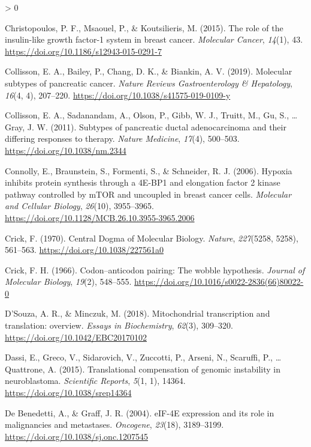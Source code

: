 \documentclass[
  12pt,
  openany]{book}
\newlength{\cslhangindent}
\newenvironment{CSLReferences}[2] %
 {%
  \setlength{\parindent}{0pt}
  \ifodd #1 \everypar{\setlength{\hangindent}{\cslhangindent}}\ignorespaces\fi
  \ifnum #2 > 0
  \setlength{\parskip}{#2\baselineskip}
  \fi
 }%
 {}
\begin{document}
\begin{CSLReferences}{1}{0}
\leavevmode\hypertarget{ref-Christopoulos2015}{}%
Christopoulos, P. F., Msaouel, P., \& Koutsilieris, M. (2015). The role of the insulin-like growth factor-1 system in breast cancer. \emph{Molecular Cancer}, \emph{14}(1), 43. \url{https://doi.org/10.1186/s12943-015-0291-7}

\leavevmode\hypertarget{ref-Collisson2019}{}%
Collisson, E. A., Bailey, P., Chang, D. K., \& Biankin, A. V. (2019). Molecular subtypes of pancreatic cancer. \emph{Nature Reviews Gastroenterology \& Hepatology}, \emph{16}(4, 4), 207--220. \url{https://doi.org/10.1038/s41575-019-0109-y}

\leavevmode\hypertarget{ref-Collisson2011}{}%
Collisson, E. A., Sadanandam, A., Olson, P., Gibb, W. J., Truitt, M., Gu, S., \ldots{} Gray, J. W. (2011). Subtypes of pancreatic ductal adenocarcinoma and their differing responses to therapy. \emph{Nature Medicine}, \emph{17}(4), 500--503. \url{https://doi.org/10.1038/nm.2344}

\leavevmode\hypertarget{ref-Connolly2006}{}%
Connolly, E., Braunstein, S., Formenti, S., \& Schneider, R. J. (2006). Hypoxia inhibits protein synthesis through a {4E}-{BP1} and elongation factor 2 kinase pathway controlled by {mTOR} and uncoupled in breast cancer cells. \emph{Molecular and Cellular Biology}, \emph{26}(10), 3955--3965. \url{https://doi.org/10.1128/MCB.26.10.3955-3965.2006}

\leavevmode\hypertarget{ref-Crick1970}{}%
Crick, F. (1970). Central {Dogma} of {Molecular Biology}. \emph{Nature}, \emph{227}(5258, 5258), 561--563. \url{https://doi.org/10.1038/227561a0}

\leavevmode\hypertarget{ref-Crick1966}{}%
Crick, F. H. (1966). Codon--anticodon pairing: The wobble hypothesis. \emph{Journal of Molecular Biology}, \emph{19}(2), 548--555. \url{https://doi.org/10.1016/s0022-2836(66)80022-0}

\leavevmode\hypertarget{ref-DSouza2018}{}%
D'Souza, A. R., \& Minczuk, M. (2018). Mitochondrial transcription and translation: overview. \emph{Essays in Biochemistry}, \emph{62}(3), 309--320. \url{https://doi.org/10.1042/EBC20170102}

\leavevmode\hypertarget{ref-Dassi2015}{}%
Dassi, E., Greco, V., Sidarovich, V., Zuccotti, P., Arseni, N., Scaruffi, P., \ldots{} Quattrone, A. (2015). Translational compensation of genomic instability in neuroblastoma. \emph{Scientific Reports}, \emph{5}(1, 1), 14364. \url{https://doi.org/10.1038/srep14364}

\leavevmode\hypertarget{ref-DeBenedetti2004}{}%
De Benedetti, A., \& Graff, J. R. (2004). {eIF}-{4E} expression and its role in malignancies and metastases. \emph{Oncogene}, \emph{23}(18), 3189--3199. \url{https://doi.org/10.1038/sj.onc.1207545}


\end{CSLReferences}
\end{document}
